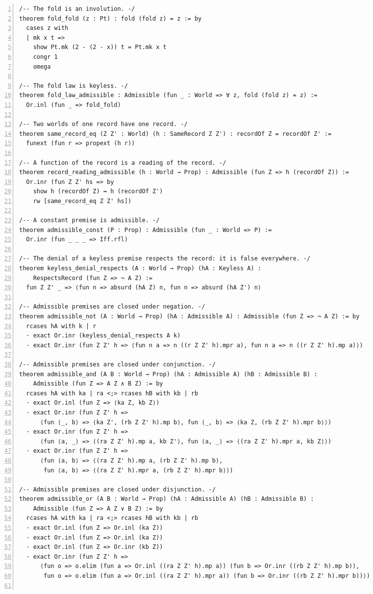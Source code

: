 \documentclass[10pt]{article}
\newcommand{\leansize}{\fontsize{5.5pt}{6.75pt}\selectfont}
\begin{document}
\begin{multicols}{2}
\begin{Verbatim}[numbers=left,firstnumber=1,numbersep=3pt,xleftmargin=2.6em,breaklines=true,breakanywhere=true,breakautoindent=false,breakindent=1.4em,breaksymbolleft={},breakanywheresymbolpre={},fontsize=\leansize]
/-- The fold is an involution. -/
theorem fold_fold (z : Pt) : fold (fold z) = z := by
  cases z with
  | mk x t =>
    show Pt.mk (2 - (2 - x)) t = Pt.mk x t
    congr 1
    omega

/-- The fold law is keyless. -/
theorem fold_law_admissible : Admissible (fun _ : World => ∀ z, fold (fold z) = z) :=
  Or.inl (fun _ => fold_fold)

/-- Two worlds of one record have one record. -/
theorem same_record_eq (Z Z' : World) (h : SameRecord Z Z') : recordOf Z = recordOf Z' :=
  funext (fun r => propext (h r))

/-- A function of the record is a reading of the record. -/
theorem record_reading_admissible (h : World → Prop) : Admissible (fun Z => h (recordOf Z)) :=
  Or.inr (fun Z Z' hs => by
    show h (recordOf Z) ↔ h (recordOf Z')
    rw [same_record_eq Z Z' hs])

/-- A constant premise is admissible. -/
theorem admissible_const (P : Prop) : Admissible (fun _ : World => P) :=
  Or.inr (fun _ _ _ => Iff.rfl)

/-- The denial of a keyless premise respects the record: it is false everywhere. -/
theorem keyless_denial_respects (A : World → Prop) (hA : Keyless A) :
    RespectsRecord (fun Z => ¬ A Z) :=
  fun Z Z' _ => ⟨fun n => absurd (hA Z) n, fun n => absurd (hA Z') n⟩

/-- Admissible premises are closed under negation. -/
theorem admissible_not (A : World → Prop) (hA : Admissible A) : Admissible (fun Z => ¬ A Z) := by
  rcases hA with k | r
  · exact Or.inr (keyless_denial_respects A k)
  · exact Or.inr (fun Z Z' h => ⟨fun n a => n ((r Z Z' h).mpr a), fun n a => n ((r Z Z' h).mp a)⟩)

/-- Admissible premises are closed under conjunction. -/
theorem admissible_and (A B : World → Prop) (hA : Admissible A) (hB : Admissible B) :
    Admissible (fun Z => A Z ∧ B Z) := by
  rcases hA with ka | ra <;> rcases hB with kb | rb
  · exact Or.inl (fun Z => ⟨ka Z, kb Z⟩)
  · exact Or.inr (fun Z Z' h =>
      ⟨fun ⟨_, b⟩ => ⟨ka Z', (rb Z Z' h).mp b⟩, fun ⟨_, b⟩ => ⟨ka Z, (rb Z Z' h).mpr b⟩⟩)
  · exact Or.inr (fun Z Z' h =>
      ⟨fun ⟨a, _⟩ => ⟨(ra Z Z' h).mp a, kb Z'⟩, fun ⟨a, _⟩ => ⟨(ra Z Z' h).mpr a, kb Z⟩⟩)
  · exact Or.inr (fun Z Z' h =>
      ⟨fun ⟨a, b⟩ => ⟨(ra Z Z' h).mp a, (rb Z Z' h).mp b⟩,
       fun ⟨a, b⟩ => ⟨(ra Z Z' h).mpr a, (rb Z Z' h).mpr b⟩⟩)

/-- Admissible premises are closed under disjunction. -/
theorem admissible_or (A B : World → Prop) (hA : Admissible A) (hB : Admissible B) :
    Admissible (fun Z => A Z ∨ B Z) := by
  rcases hA with ka | ra <;> rcases hB with kb | rb
  · exact Or.inl (fun Z => Or.inl (ka Z))
  · exact Or.inl (fun Z => Or.inl (ka Z))
  · exact Or.inl (fun Z => Or.inr (kb Z))
  · exact Or.inr (fun Z Z' h =>
      ⟨fun o => o.elim (fun a => Or.inl ((ra Z Z' h).mp a)) (fun b => Or.inr ((rb Z Z' h).mp b)),
       fun o => o.elim (fun a => Or.inl ((ra Z Z' h).mpr a)) (fun b => Or.inr ((rb Z Z' h).mpr b))⟩)


\end{Verbatim}
\end{multicols}
\end{document}
